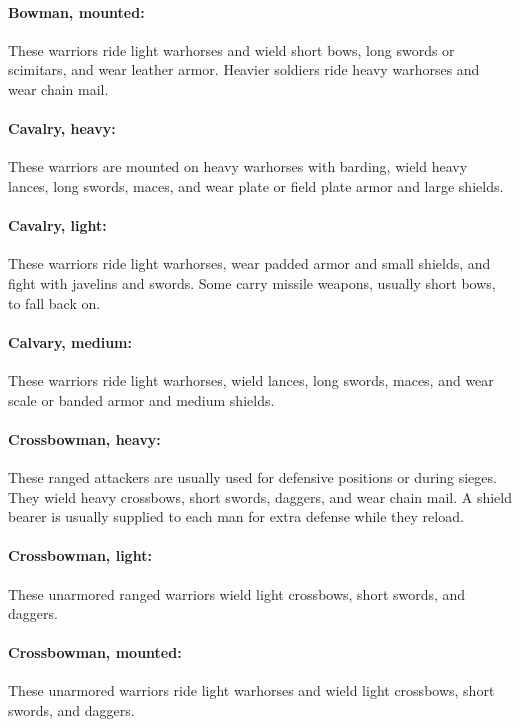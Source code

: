 \begin{multicols}{2}
\paragraph{Bowman, mounted:} These warriors ride light warhorses and wield short bows, long swords or scimitars, and wear leather armor.  Heavier soldiers ride heavy warhorses and wear chain mail.

\paragraph{Cavalry, heavy:} These warriors are mounted on heavy warhorses with barding, wield heavy lances, long swords, maces, and wear plate or field plate armor and large shields.

\paragraph{Cavalry, light:} These warriors ride light warhorses, wear padded armor and small shields, and fight with javelins and swords.  Some carry missile weapons, usually short bows, to fall back on.

\paragraph{Calvary, medium:} These warriors ride light warhorses, wield lances, long swords, maces, and wear scale or banded armor and medium shields.

\paragraph{Crossbowman, heavy:}  These ranged attackers are usually used for defensive positions or during sieges.  They wield heavy crossbows, short swords, daggers, and wear chain mail.  A shield bearer is usually supplied to each man for extra defense while they reload.

\paragraph{Crossbowman, light:} These unarmored ranged warriors wield light crossbows, short swords, and daggers.  

\paragraph{Crossbowman, mounted:}  These unarmored warriors ride light warhorses and wield light crossbows, short swords, and daggers.


\end{multicols}
